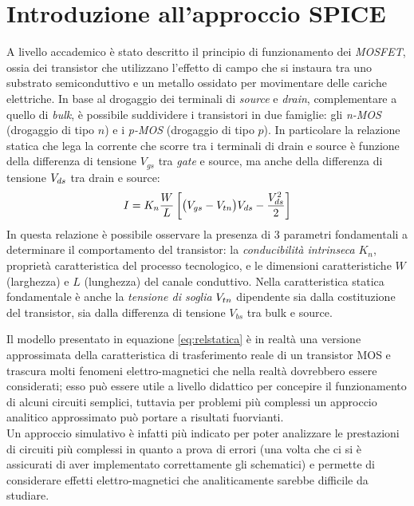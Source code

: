 \chapter{Introduzione all'approccio SPICE}
	
	A livello accademico è stato descritto il principio di funzionamento dei \textit{MOSFET}, ossia dei transistor che utilizzano l'effetto di campo che si instaura tra uno substrato semiconduttivo e un metallo ossidato per movimentare delle cariche elettriche. In base al drogaggio dei terminali di \textit{source} e \textit{drain}, complementare a quello di \textit{bulk}, è possibile suddividere i transistori in due famiglie: gli \textit{n-MOS} (drogaggio di tipo $n$) e i \textit{p-MOS} (drogaggio di tipo $p$). In particolare la relazione statica che lega la corrente che scorre tra i terminali di drain e source è funzione della differenza di tensione $V_{gs}$ tra \textit{gate} e source, ma anche della differenza di tensione $V_{ds}$ tra drain e source:
	\begin{equation} \label{eq:relstatica}
		I = K_n \frac W L \left[ \big(V_{gs} - V_{tn}\big)V_{ds} - \frac{V_{ds}^2}{2} \right]
	\end{equation} 
	In questa relazione è possibile osservare la presenza di 3 parametri fondamentali a determinare il comportamento del transistor: la \textit{conducibilità intrinseca} $K_n$, proprietà caratteristica del processo tecnologico, e le dimensioni caratteristiche $W$ (larghezza) e $L$ (lunghezza) del canale conduttivo. Nella caratteristica statica fondamentale è anche la \textit{tensione di soglia} $V_{tn}$ dipendente sia dalla costituzione del transistor, sia dalla differenza di tensione $V_{bs}$ tra bulk e source. 
	
	Il modello presentato in equazione \ref{eq:relstatica} è in realtà una versione approssimata della caratteristica di trasferimento reale di un transistor MOS e trascura molti fenomeni elettro-magnetici che nella realtà dovrebbero essere considerati; esso può essere utile a livello didattico per concepire il funzionamento di alcuni circuiti semplici, tuttavia per problemi più complessi un approccio analitico approssimato può portare a risultati fuorvianti. \\
	Un approccio simulativo è infatti più indicato per poter analizzare le prestazioni di circuiti più complessi in quanto a prova di errori (una volta che ci si è assicurati di aver implementato correttamente gli schematici) e permette di considerare effetti elettro-magnetici che analiticamente sarebbe difficile da studiare.
	

